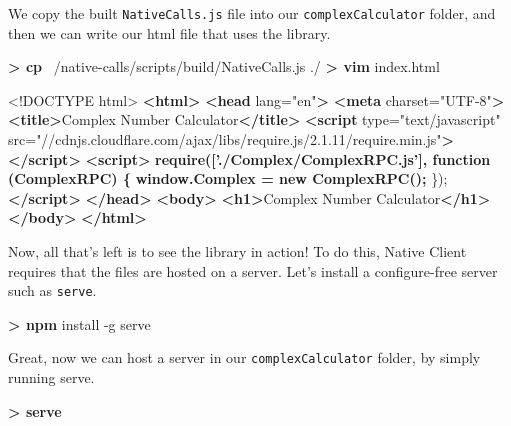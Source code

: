 \documentclass[]{article}
\newenvironment{Shaded}{}{}
\newcommand{\KeywordTok}[1]{\textcolor[rgb]{0.00,0.44,0.13}{\textbf{{#1}}}}
\newcommand{\DataTypeTok}[1]{\textcolor[rgb]{0.56,0.13,0.00}{{#1}}}
\newcommand{\StringTok}[1]{\textcolor[rgb]{0.25,0.44,0.63}{{#1}}}
\newcommand{\OtherTok}[1]{\textcolor[rgb]{0.00,0.44,0.13}{{#1}}}
\newcommand{\ErrorTok}[1]{\textcolor[rgb]{1.00,0.00,0.00}{\textbf{{#1}}}}
\newcommand{\NormalTok}[1]{{#1}}
\begin{document}
We copy the built \texttt{NativeCalls.js} file into our
\texttt{complexCalculator} folder, and then we can write our html file
that uses the library.

\begin{Shaded}
\begin{Highlighting}[]
\KeywordTok{> cp} \NormalTok{~/native-calls/scripts/build/NativeCalls.js ./}
\KeywordTok{> vim} \NormalTok{index.html}
\end{Highlighting}
\end{Shaded}

\begin{Shaded}
\begin{Highlighting}[]
\DataTypeTok{<!DOCTYPE }\NormalTok{html}\DataTypeTok{>}
\KeywordTok{<html>}
\KeywordTok{<head}\OtherTok{ lang=}\StringTok{"en"}\KeywordTok{>}
    \KeywordTok{<meta}\OtherTok{ charset=}\StringTok{"UTF-8"}\KeywordTok{>}
    \KeywordTok{<title>}\NormalTok{Complex Number Calculator}\KeywordTok{</title>}
    \KeywordTok{<script}\OtherTok{ type=}\StringTok{"text/javascript"}\OtherTok{ src=}\StringTok{"//cdnjs.cloudflare.com/ajax/libs/require.js/2.1.11/require.min.js"}\KeywordTok{></script>}
    \KeywordTok{<script>}
\ErrorTok{    require(['./Complex/ComplexRPC.js'], function (ComplexRPC) \{}
\ErrorTok{        window.Complex = new ComplexRPC();}
    \NormalTok{\});}
    \KeywordTok{</script>}
\KeywordTok{</head>}
\KeywordTok{<body>}
\KeywordTok{<h1>}\NormalTok{Complex Number Calculator}\KeywordTok{</h1>}
\KeywordTok{</body>}
\KeywordTok{</html>}
\end{Highlighting}
\end{Shaded}

Now, all that's left is to see the library in action! To do this, Native
Client requires that the files are hosted on a server. Let's install a
configure-free server such as \texttt{serve}.

\begin{Shaded}
\begin{Highlighting}[]
\KeywordTok{> npm} \NormalTok{install -g serve}
\end{Highlighting}
\end{Shaded}

Great, now we can host a server in our \texttt{complexCalculator}
folder, by simply running serve.

\begin{Shaded}
\begin{Highlighting}[]
\KeywordTok{> serve}
\end{Highlighting}
\end{Shaded}
\end{document}
